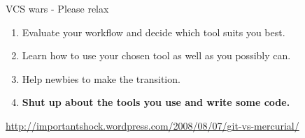 \begin{frame}{VCS wars - Please relax}
    \begin{enumerate}
        \item Evaluate your workflow and decide which tool suits you best.
        \item Learn how to use your chosen tool as well as you possibly can.
        \item Help newbies to make the transition.
        \item \textbf{Shut up about the tools you use and write some code.}
    \end{enumerate}

    \tiny\url{http://importantshock.wordpress.com/2008/08/07/git-vs-mercurial/}
\end{frame}
